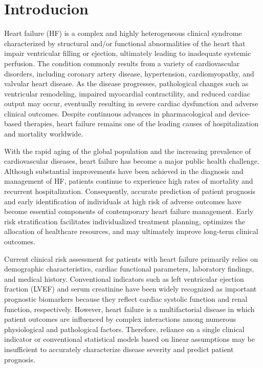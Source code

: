 \documentclass[12pt]{article}
\begin{document}
\section{Introducion}

Heart failure (HF) is a complex and highly heterogeneous clinical syndrome characterized by structural and/or functional abnormalities of the heart that impair ventricular filling or ejection, ultimately leading to inadequate systemic perfusion. The condition commonly results from a variety of cardiovascular disorders, including coronary artery disease, hypertension, cardiomyopathy, and valvular heart disease. As the disease progresses, pathological changes such as ventricular remodeling, impaired myocardial contractility, and reduced cardiac output may occur, eventually resulting in severe cardiac dysfunction and adverse clinical outcomes. Despite continuous advances in pharmacological and device-based therapies, heart failure remains one of the leading causes of hospitalization and mortality worldwide.\cite{McDonagh2021,Heidenreich2022}

With the rapid aging of the global population and the increasing prevalence of cardiovascular diseases, heart failure has become a major public health challenge. Although substantial improvements have been achieved in the diagnosis and management of HF, patients continue to experience high rates of mortality and recurrent hospitalization. Consequently, accurate prediction of patient prognosis and early identification of individuals at high risk of adverse outcomes have become essential components of contemporary heart failure management. Early risk stratification facilitates individualized treatment planning, optimizes the allocation of healthcare resources, and may ultimately improve long-term clinical outcomes.\cite{Savarese2023}

Current clinical risk assessment for patients with heart failure primarily relies on demographic characteristics, cardiac functional parameters, laboratory findings, and medical history. Conventional indicators such as left ventricular ejection fraction (LVEF) and serum creatinine have been widely recognized as important prognostic biomarkers because they reflect cardiac systolic function and renal function, respectively. However, heart failure is a multifactorial disease in which patient outcomes are influenced by complex interactions among numerous physiological and pathological factors. Therefore, reliance on a single clinical indicator or conventional statistical models based on linear assumptions may be insufficient to accurately characterize disease severity and predict patient prognosis.
\end{document}
